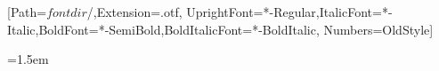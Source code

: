 \usepackage[paperwidth=5.5in,paperheight=8.5in,
  top=1.93cm,bottom=1.93cm,inner=2.29cm,outer=1.52cm,
  headsep=0.45cm,headheight=14pt,footskip=0.89cm,twoside]{geometry}
\usepackage{fontspec}
\setmainfont{EBGaramond}[Path=$fontdir$/,Extension=.otf,
  UprightFont=*-Regular,ItalicFont=*-Italic,BoldFont=*-SemiBold,BoldItalicFont=*-BoldItalic,
  Numbers=OldStyle]
\usepackage{microtype}
\linespread{1.12}
\frenchspacing
\emergencystretch=1.5em
\usepackage{fancyhdr}
\pagestyle{fancy}
\fancyhf{}
\fancyfoot[C]{\footnotesize\thepage}
\renewcommand{\headrulewidth}{0pt}
\fancypagestyle{plain}{\fancyhf{}\renewcommand{\headrulewidth}{0pt}}
\setlength{\parindent}{0.5cm}
\setlength{\parskip}{0pt}
\raggedbottom
{} 
\makeatletter
\renewcommand{\@makechapterhead}[1]{\vspace*{1.6cm}{\centering\Large\addfontfeatures{Numbers=Lining}#1\par}\vspace{1cm}}
\renewcommand{\@makeschapterhead}[1]{\vspace*{1.6cm}{\centering\Large\addfontfeatures{Numbers=Lining}#1\par}\vspace{1cm}}
\makeatother
\renewcommand{\thechapter}{}
\newcommand{\dateline}[1]{{\centering\small\scshape\MakeLowercase{#1}\par}\bigskip\noindent}
\newcommand{\scenebreak}{\par\medskip{\centering *\quad*\quad*\par}\medskip\noindent}
